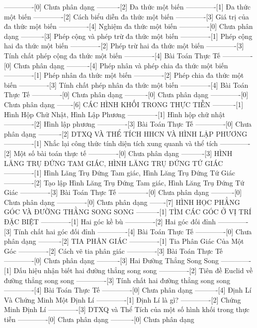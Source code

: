 -------------[0] Chưa phân dạng
----------[2] Đa thức một biến
-------------[1] Đa thức một biến
-------------[2] Cách biểu diễn đa thức một biến
-------------[3] Giá trị của đa thức một biến
-------------[4] Nghiệm đa thức một biến
-------------[0] Chưa phân dạng
----------[3] Phép cộng và phép trừ đa thức một biến
-------------[1] Phép cộng hai đa thức một biến
-------------[2] Phép trừ hai đa thức một biến
-------------[3] Tính chất phép cộng đa thức một biến
-------------[4] Bài Toán Thực Tế
-------------[0] Chưa phân dạng
----------[4] Phép nhân và phép chia đa thức một biến
-------------[1] Phép nhân đa thức một biến
-------------[2] Phép chia đa thức một biến
-------------[3] Tính chất phép nhân đa thức một biến
-------------[4] Bài Toán Thực Tế
-------------[0] Chưa phân dạng
----------[0] Chưa phân dạng
-------------[0] Chưa phân dạng
-------[6] CÁC HÌNH KHỐI TRONG THỰC TIỄN
----------[1] Hình Hộp Chữ Nhật, Hình Lập Phương
-------------[1] Hình hộp chữ nhật
-------------[2] Hình lập phương
-------------[3] Bài Toán Thực Tế
-------------[0] Chưa phân dạng
----------[2] DTXQ VÀ THỂ TÍCH HHCN VÀ HÌNH LẬP PHƯƠNG
-------------[1] Nhắc lại công thức tính diện tích xung quanh và thể tích
-------------[2] Một số bài toán thực tế
-------------[0] Chưa phân dạng
----------[3] HÌNH LĂNG TRỤ ĐỨNG TAM GIÁC, HÌNH LĂNG TRỤ ĐỨNG TỨ GIÁC
-------------[1] Hình Lăng Trụ Đứng Tam giác, Hình Lăng Trụ Đứng Tứ Giác
-------------[2] Tạo lập Hình Lăng Trụ Đứng Tam giác, Hình Lăng Trụ Đứng Tứ Giác
-------------[3] Bài Toán Thực Tế
-------------[0] Chưa phân dạng
----------[0] Chưa phân dạng
-------------[0] Chưa phân dạng
-------[7] HÌNH HỌC PHẲNG GÓC VÀ ĐƯỜNG THẰNG SONG SONG
----------[1] TÌM CÁC GÓC Ở VỊ TRÍ ĐẶC BIỆT
-------------[1] Hai góc kề bù
-------------[2] Hai góc đối đỉnh
-------------[3] Tính chất hai góc đối đỉnh
-------------[4] Bài Toán Thực Tế
-------------[0] Chưa phân dạng
----------[2] TIA PHÂN GIÁC
-------------[1] Tia Phân Giác Của Một Góc
-------------[2] Cách vẽ tia phân giác
-------------[3] Bài Toán Thực Tế
-------------[0] Chưa phân dạng
----------[3] Hai Đường Thẳng Song Song
-------------[1] Dấu hiệu nhận biết hai đường thẳng song song
-------------[2] Tiên đề Euclid về đường thẳng song song
-------------[3] Tính chất hai đường thẳng song song 
-------------[4] Bài Toán Thực Tế
-------------[0] Chưa phân dạng
----------[4] Định Lí Và Chứng Minh Một Định Lí
-------------[1] Định Lí là gì?
-------------[2] Chứng Minh Định Lí
-------------[3] DTXQ và Thể Tích của một số hình khối trong thực tiễn
-------------[0] Chưa phân dạng
----------[0] Chưa phân dạng
